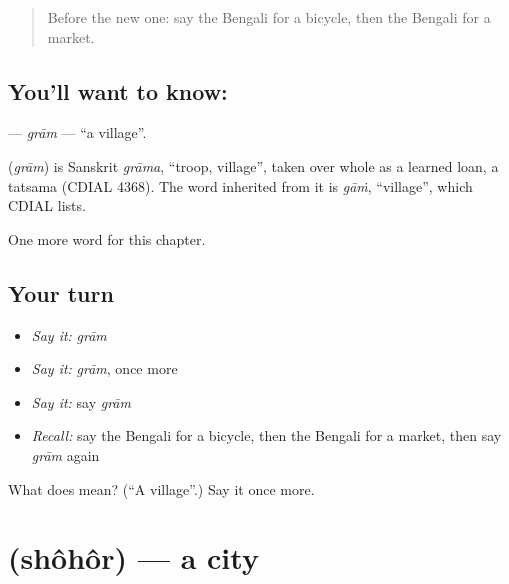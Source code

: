 \label{lesson:BN-C84-gram}



\begin{quote}
Before the new one: say the Bengali for a bicycle, then the Bengali for a market.
\end{quote}

\subsection*{You'll want to know: }
\textbf{} — \emph{grām} — \textquotedblleft{}a village\textquotedblright{}.

\begin{cousinweb}
\textbf{} (\emph{grām}) is Sanskrit \emph{grāma}, \textquotedblleft{}troop, village\textquotedblright{}, taken over whole as a learned loan, a tatsama (CDIAL 4368). The word inherited from it is \emph{gāṁ}, \textquotedblleft{}village\textquotedblright{}, which CDIAL lists.
\end{cousinweb}

\begin{grammarlens}[title={What you've built}]
One more word for this chapter.
\end{grammarlens}

\subsection*{Your turn}
\begin{itemize}
\raggedright
  \item \emph{Say it:} \emph{grām}
  \item \emph{Say it:} \emph{grām}, once more
  \item \emph{Say it:} say \emph{grām}
  \item \emph{Recall:} say the Bengali for a bicycle, then the Bengali for a market, then say \emph{grām} again
\end{itemize}

\begin{tcolorbox}[breakable,colback=teal!4,colframe=teal!35!black,title={Before you move on}]
What does  mean? (\textquotedblleft{}A village\textquotedblright{}.) Say it once more.
\end{tcolorbox}
\section[\texorpdfstring{\bn{শহর} (shôhôr)}{শহর (shôhôr)}]{ (shôhôr) — a city}

